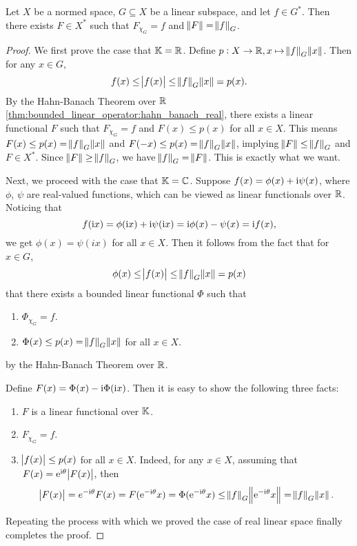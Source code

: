 \begin{thm}
Let $X$ be a normed space, $G \subseteq X$ be a linear subspace, and let 
$f \in G^\ast$. 
Then there exists $F \in X^\ast$ such that $F_{\chi_G} = f$ and $\norm{F} 
= \norm{f}_G$.
\end{thm}
\begin{proof}
We first prove the case that $\mathbb{K} = \mathbb{R}$. 
Define $p: X \to \mathbb{R}, x \mapsto \norm{f}_G \norm{x}$. 
Then for any $x \in G$, 
\begin{equation*}
    f(x) \le \abs{f(x)} \le \norm{f}_G \norm{x} = p(x). 
\end{equation*}
By the Hahn-Banach Theorem over $\mathbb{R}$ 
\ref{thm:bounded_linear_operator:hahn_banach_real}, there exists a linear 
functional $F$ such that $F_{\chi_{G}} = f$ and $F(x) \le p(x)$ for all 
$x \in X$. 
This means $F(x) \le p(x) = \norm{f}_G \norm{x}$ and $F(-x) \le p(x) = 
\norm{f}_G \norm{x}$, implying $\norm{F} \le \norm{f}_G$ and $F \in X^\ast$. 
Since $\norm{F} \ge \norm{f}_G$, we have $\norm{f}_G = \norm{F}$. 
This is exactly what we want. 

Next, we proceed with the case that $\mathbb{K} = \mathbb{C}$. 
Suppose $f(x) = \phi(x) + \mathrm{i} \psi(x)$, where $\phi$, $\psi$ are real-valued 
functions, which can be viewed as linear functionals over $\mathbb{R}$. 
Noticing that 
\begin{equation*}
    f(\mathrm{i} x) = \phi(\mathrm{i} x) + \mathrm{i} \psi(\mathrm{i} x) = \mathrm{i} \phi(x) - \psi(x) 
    = \mathrm{i} f(x),  
\end{equation*}
we get $\phi(x) = \psi(ix)$ for all $x \in X$. 
Then it follows from the fact that for $x \in G$, 
\begin{equation*}
    \phi(x) \le \abs{f(x)} \le \norm{f}_G \norm{x} = p(x)
\end{equation*}
that there exists a bounded linear functional $\Phi$ such that 
\begin{enumerate}
    \item $\Phi_{\chi_G} = f$. 
    \item $\Phi(x) \le p(x) = \norm{f}_G \norm{x}$ for all $x \in X$. 
\end{enumerate}
by the Hahn-Banach Theorem over $\mathbb{R}$. 

Define $F(x) = \Phi(x) - \mathrm{i} \Phi(\mathrm{i} x)$. 
Then it is easy to show the following three facts: 
\begin{enumerate}
    \item $F$ is a linear functional over $\mathbb{K}$. 
    \item $F_{\chi_{G}} = f$. 
    \item $\abs{f(x)} \le p(x)$ for all $x \in X$. 
    Indeed, for any $x \in X$, assuming that $F(x) = \mathrm{e}^{\mathrm{i} \theta} 
    \abs{F(x)}$, 
    then 
    \begin{equation*}
        \abs{F(x)} = e^{- \mathrm{i} \theta} F(x)
        = F(\mathrm{e} ^{- \mathrm{i} \theta} x) = \Phi(\mathrm{e} ^{- \mathrm{i} \theta} x) 
        \le \norm{f}_G \norm{\mathrm{e} ^{- \mathrm{i} \theta} x} 
        = \norm{f}_G \norm{x}.
    \end{equation*}
\end{enumerate}
Repeating the process with which we proved the case of real linear space 
finally completes the proof. 
\end{proof}

